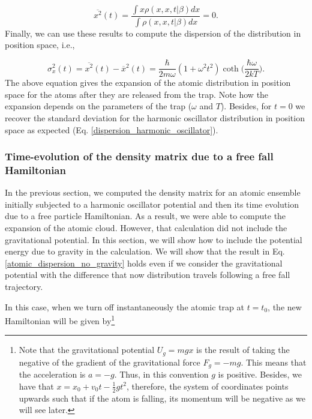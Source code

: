 \documentclass{article}
\begin{document}
\begin{equation}
    \overline{x^{2}} (t)= \frac{\int x \rho(x,x,t|\beta) dx}{\int \rho(x,x,t|\beta) dx} =  0.
\end{equation}
%
Finally, we can use these results to compute the dispersion of the distribution in position space, i.e.,

\begin{equation}\label{atomic_dispersion_no_gravity}
    \sigma_{x}^{2} (t)= \overline{x^{2}}(t) - \overline{x}^{2}(t) = \frac{\hbar}{2m\omega}(1+\omega^{2}t^{2})\coth\bigg( \frac{\hbar \omega}{2kT} \bigg).
\end{equation}
%
The above equation gives the expansion of the atomic distribution in position space for the atoms after they are released from the trap. Note how the expansion depends on the parameters of the trap ($\omega$ and $T$). Besides, for $t=0$ we recover the standard deviation for the harmonic oscillator distribution in position space as expected (Eq. \ref{dispersion_harmonic_oscillator}).

\subsubsection{\label{split_op_method_section}Time-evolution of the density matrix due to a free fall Hamiltonian}
In the previous section, we computed the density matrix for an atomic ensemble initially subjected to a harmonic oscillator potential and then its time evolution due to a free particle Hamiltonian. As a result, we were able to compute the expansion of the atomic cloud. However, that calculation did not include the gravitational potential. In this section, we will show how to include the potential energy due to gravity in the calculation. We will show that the result in Eq. \ref{atomic_dispersion_no_gravity} holds even if we consider the gravitational potential with the difference that now distribution travels following a free fall trajectory.

In this case, when we turn off instantaneously the atomic trap at $t=t_{0}$, the new Hamiltonian will be given by\footnote{Note that the gravitational potential $U_{g}=mgx$ is the result of taking the negative of the gradient of the gravitational force $F_{g}=-mg$. This means that the acceleration is $a=-g$. Thus, in this convention $g$ is positive. Besides, we have that $x=x_{0}+v_{0}t-\frac{1}{2}gt^{2}$, therefore, the system of coordinates points upwards such that if the atom is falling, its momentum will be negative as we will see later.}
\end{document}
